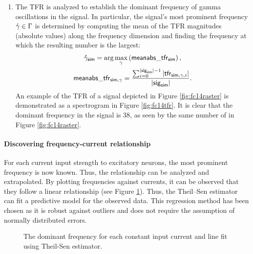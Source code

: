 \begin{enumerate}
    \item The TFR is analyzed to establish the dominant frequency of gamma oscillations in the signal. In particular, the signal's most prominent frequency $\mathring{\gamma} \in \Gamma$ is determined by computing the mean of the TFR magnitudes (absolute values) along the frequency dimension and finding the frequency at which the resulting number is the largest:
    \begin{equation}
    \begin{gathered}
        \mathring{\gamma}_{\mathsf{sim}} = \arg \max_\gamma \left(
            \mathsf{meanabs}\_\mathsf{tfr}_{\mathsf{sim}}
        \right),
        \\
        \mathsf{meanabs}\_\mathsf{tfr}_{\mathsf{sim}, \gamma} = 
        \frac{
            \sum_{i=0}^{|\mathsf{sig}_{\mathsf{sim}}| - 1} 
            |\mathsf{tfr}_{\mathsf{sim}, \gamma, i}|
        }{
           |\mathsf{sig}_{\mathsf{sim}}|
        }.
    \end{gathered}
    \end{equation}
    An example of the TFR of a signal depicted in Figure \ref{fig:fc14raster} is demonstrated as a spectrogram in Figure \ref{fig:fc14tfr}. It is clear that the dominant frequency in the signal is 38, as seen by the same number of  in Figure \ref{fig:fc14raster}.
\end{enumerate}


\paragraph{Discovering frequency-current relationship}

For each current input strength to excitatory neurons, the most prominent frequency is now known. Thus, the relationship can be analyzed and extrapolated. By plotting frequencies against currents, it can be observed that they follow a linear relationship (see Figure \ref{fig:fc-relationship}). Thus, the Theil–Sen estimator can fit a predictive model for the observed data. This regression method has been chosen as it is robust against outliers and does not require the assumption of normally distributed errors. 

\begin{figure}[!htp]
    \centering
    
    \caption[Frequency-current relationship]{The dominant frequency for each constant input current and line fit using Theil-Sen estimator.}
    \label{fig:fc-relationship}
\end{figure}

